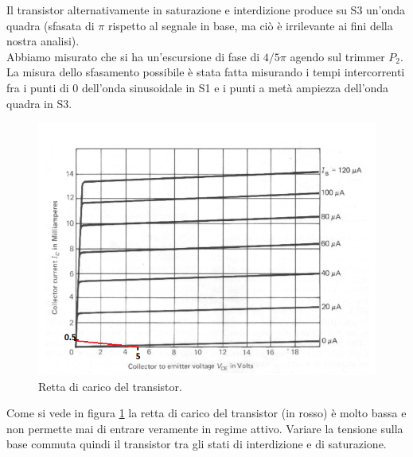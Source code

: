 \documentclass[10pt,a4paper]{article}
\begin{document}
Il transistor alternativamente in saturazione e interdizione produce su S3 un'onda quadra (sfasata di $\pi$ rispetto al segnale in base, ma ciò è irrilevante ai fini della nostra analisi).\\
Abbiamo misurato che si ha un'escursione di fase di $4/5 \pi$ agendo sul trimmer $P_2$. La misura dello sfasamento possibile è stata fatta misurando i tempi intercorrenti fra i punti di 0 dell'onda sinusoidale in S1 e i punti a metà ampiezza  dell'onda quadra in S3.\\


\begin{figure}[!htb]
  \centering
  \includegraphics[scale=0.6]{transistorbjt.png}
\caption{Retta di carico del transistor.\label{fig:transistor}}
\end{figure}

Come si vede in figura \ref{fig:transistor} la retta di carico del transistor (in rosso) è molto bassa e non permette mai di entrare veramente in regime attivo. Variare la tensione sulla base commuta quindi il transistor tra gli stati di interdizione e di saturazione.\\

\end{document}
